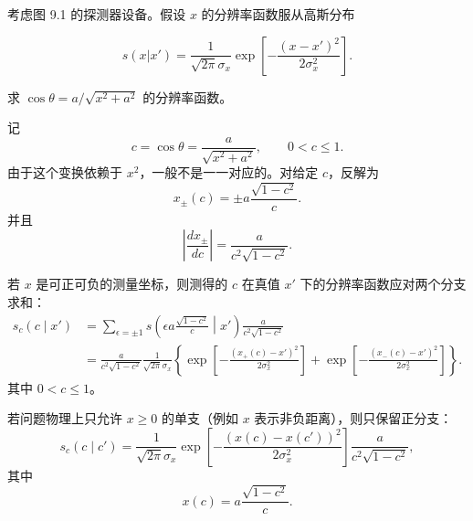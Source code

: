 ﻿


\begin{question}
考虑图 9.1 的探测器设备。假设 \(x\) 的分辨率函数服从高斯分布

\[
s(x|x')=\frac{1}{\sqrt{2\pi}\sigma_x}\exp\left[-\frac{(x-x')^2}{2\sigma_x^2}\right].
\]

求 \(\cos\theta=a/\sqrt{x^2+a^2}\) 的分辨率函数。
\begin{solution}
记
\[
c=\cos\theta=\frac{a}{\sqrt{x^2+a^2}},
\qquad 0<c\le1.
\]
由于这个变换依赖于 \(x^2\)，一般不是一一对应的。对给定 \(c\)，反解为
\[
x_\pm(c)=\pm a\frac{\sqrt{1-c^2}}{c}.
\]
并且
\[
\left|\frac{dx_\pm}{dc}\right|
=\frac{a}{c^2\sqrt{1-c^2}}.
\]

若 \(x\) 是可正可负的测量坐标，则测得的 \(c\) 在真值 \(x'\) 下的分辨率函数应对两个分支求和：
\[
\begin{split}
s_c(c\mid x')
&=\sum_{\epsilon=\pm1}
 s\left(\epsilon a\frac{\sqrt{1-c^2}}{c}\middle|x'\right)
 \frac{a}{c^2\sqrt{1-c^2}}\\
&=\frac{a}{c^2\sqrt{1-c^2}}
\frac{1}{\sqrt{2\pi}\sigma_x}
\left\{
\exp\left[-\frac{(x_+(c)-x')^2}{2\sigma_x^2}\right]
+
\exp\left[-\frac{(x_-(c)-x')^2}{2\sigma_x^2}\right]
\right\}.
\end{split}
\]
其中 \(0<c\le1\)。

若问题物理上只允许 \(x\ge0\) 的单支（例如 \(x\) 表示非负距离），则只保留正分支：
\[
s_c(c\mid c')=
\frac{1}{\sqrt{2\pi}\sigma_x}
\exp\left[-\frac{(x(c)-x(c'))^2}{2\sigma_x^2}\right]
\frac{a}{c^2\sqrt{1-c^2}},
\]
其中
\[
x(c)=a\frac{\sqrt{1-c^2}}{c}.
\]
\end{solution}
\end{question}


